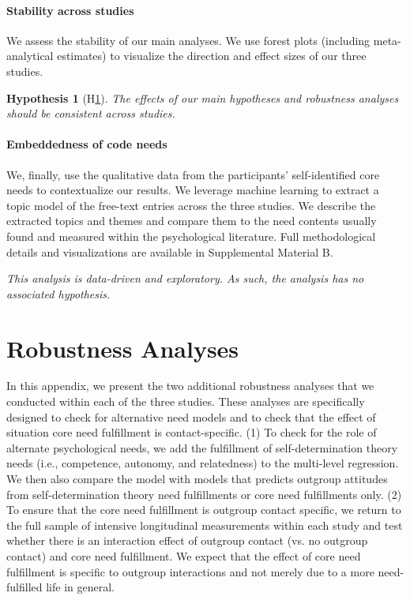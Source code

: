 \documentclass[man, 12pt, a4paper, mask]{apa7}
\theoremstyle{break}
\theoremstyle{plain}
\newtheorem{hyp}{Hypothesis}
\begin{document}
\paragraph{Stability across studies}
We assess the stability of our main analyses. We use forest plots (including meta-analytical estimates) to visualize the direction and effect sizes of our three studies.

\begin{mdframed}[style=mdfhypothesis]
    \begin{hyp}[H\ref{hyp:Stability}] \label{hyp:Stability}
    \addtolength{\leftskip}{1em}
    The effects of our main hypotheses and robustness analyses should be consistent across studies.
    \end{hyp}
\end{mdframed}

\paragraph{Embeddedness of code needs}
We, finally, use the qualitative data from the participants' self-identified core needs to contextualize our results. We leverage machine learning to extract a topic model of the free-text entries across the three studies. We describe the extracted topics and themes and compare them to the need contents usually found and measured within the psychological literature. Full methodological details and visualizations are available in Supplemental Material B.

\begin{mdframed}[style=mdfhypothesis]
    \addtolength{\leftskip}{1em}
    \textit{This analysis is data-driven and exploratory. As such, the analysis has no associated hypothesis.}
\end{mdframed}



\section{Robustness Analyses}
\label{app:AppendixRobustness}

In this appendix, we present the two additional robustness analyses that we conducted within each of the three studies. These analyses are specifically designed to check for alternative need models and to check that the effect of situation core need fulfillment is contact-specific. (1) To check for the role of alternate psychological needs, we add the fulfillment of self-determination theory needs (i.e., competence, autonomy, and relatedness) to the multi-level regression. We then also compare the model with models that predicts outgroup attitudes from self-determination theory need fulfillments or core need fulfillments only. (2) To ensure that the core need fulfillment is outgroup contact specific, we return to the full sample of intensive longitudinal measurements within each study and test whether there is an interaction effect of outgroup contact (vs. no outgroup contact) and core need fulfillment. We expect that the effect of core need fulfillment is specific to outgroup interactions and not merely due to a more need-fulfilled life in general.
\end{document}
